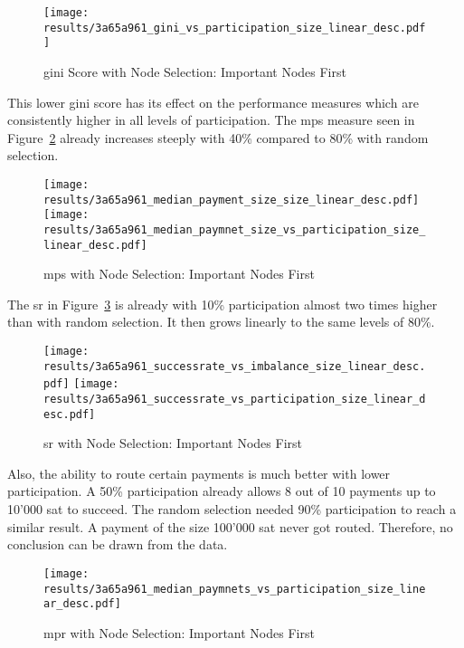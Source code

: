 \documentclass[final]{fhnwreport}       %
\begin{document}
\begin{figure}[H]
\centering
\texttt{[image: results/3a65a961\_gini\_vs\_participation\_size\_linear\_desc.pdf]}
\caption{\gls{gini} Score with Node Selection: Important Nodes First}
\label{fig:gini_part_size_linear_desc}
\end{figure}

This lower \gls{gini} score has its effect on the performance measures which are consistently higher in all levels of participation. The \gls{mps} measure seen in Figure~\ref{fig:pay_size_size_linear_desc} already increases steeply with 40\% compared to 80\% with random selection.

\begin{figure}[htp]
\centering
\texttt{[image: results/3a65a961\_median\_payment\_size\_size\_linear\_desc.pdf]}\hfill
\texttt{[image: results/3a65a961\_median\_paymnet\_size\_vs\_participation\_size\_linear\_desc.pdf]}
\caption{\gls{mps} with Node Selection: Important Nodes First}
\label{fig:pay_size_size_linear_desc}
\end{figure}


The \gls{sr} in Figure~\ref{fig:success_size_linear_desc} is already with 10\% participation almost two times higher than with random selection. It then grows linearly to the same levels of 80\%.

\begin{figure}[htp]
\centering
\texttt{[image: results/3a65a961\_successrate\_vs\_imbalance\_size\_linear\_desc.pdf]}\hfill
\texttt{[image: results/3a65a961\_successrate\_vs\_participation\_size\_linear\_desc.pdf]}
\caption{\gls{sr} with Node Selection: Important Nodes First}
\label{fig:success_size_linear_desc}
\end{figure}

Also, the ability to route certain payments is much better with lower participation. A 50\% participation already allows 8 out of 10 payments up to 10'000 sat to succeed. The random selection needed 90\% participation to reach a similar result. A payment of the size 100'000 sat never got routed. Therefore, no conclusion can be drawn from the data.

\begin{figure}[htp]
\centering
\texttt{[image: results/3a65a961\_median\_paymnets\_vs\_participation\_size\_linear\_desc.pdf]}
\caption{\gls{mpr} with Node Selection: Important Nodes First}
\label{fig:sizes_size_linear_desc}
\end{figure}
\end{document}
